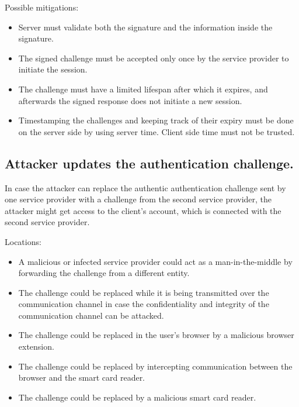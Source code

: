 Possible mitigations:
\begin{itemize}
\item Server must validate both the signature and the information inside the signature.

\item The signed challenge must be accepted only once by the service provider to initiate the session.

\item The challenge must have a limited lifespan after which it expires, and afterwards the signed response does not initiate a new session.

\item Timestamping the challenges and keeping track of their expiry must be done on the server side by using server time. Client side time must not be trusted.
\end{itemize}


\subsection{Attacker updates the authentication challenge.}
\label{threat:update-authchallenge}
In case the attacker can replace the authentic authentication challenge sent by one service provider with a challenge from the second service provider, the attacker might get access to the client's account, which is connected with the second service provider.

Locations:
\begin{itemize}
\item A malicious or infected service provider could act as a man-in-the-middle by forwarding the challenge from a different entity.
\item The challenge could be replaced while it is being transmitted over the communication channel in case the confidentiality and integrity of the communication channel can be attacked.
\item The challenge could be replaced in the user's browser by a malicious browser extension.
\item The challenge could be replaced by intercepting communication between the browser and the smart card reader.
\item The challenge could be replaced by a malicious smart card reader.
\end{itemize}

